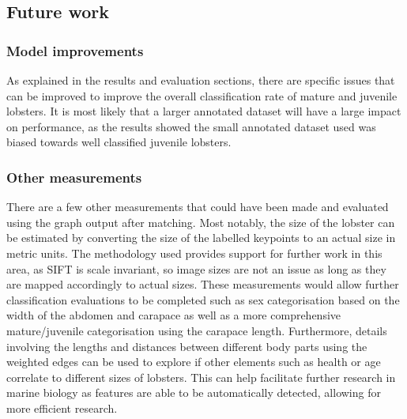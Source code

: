 \subsection{Future work}
\subsubsection{Model improvements}
As explained in the results and evaluation sections, there are specific issues that can be improved to improve the overall classification rate of mature and juvenile lobsters. It is most likely that a larger annotated dataset will have a large impact on performance, as the results showed the small annotated dataset used was biased towards well classified juvenile lobsters. 

\subsubsection{Other measurements}
There are a few other measurements that could have been made and evaluated using the graph output after matching. Most notably, the size of the lobster can be estimated by converting the size of the labelled keypoints to an actual size in metric units. The methodology used provides support for further work in this area, as SIFT is scale invariant, so image sizes are not an issue as long as they are mapped accordingly to actual sizes. These measurements would allow further classification evaluations to be completed such as sex categorisation based on the width of the abdomen and carapace \cite{lobster-video} as well as a more comprehensive mature/juvenile categorisation using the carapace length. Furthermore, details involving the lengths and distances between different body parts using the weighted edges can be used to explore if other elements such as health or age correlate to different sizes of lobsters. This can help facilitate further research in marine biology as features are able to be automatically detected, allowing for more efficient research. 

